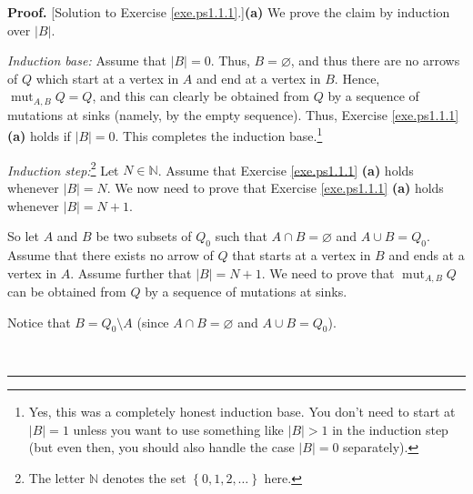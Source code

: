 \documentclass[numbers=enddot,12pt,final,onecolumn,notitlepage]{scrartcl}%
\numberwithin{exer}{section}
\theoremstyle{definition}
\newenvironment{proof}[1][Proof]{\noindent\textbf{#1.} }{\ \rule{0.5em}{0.5em}}
\begin{document}
\begin{proof}
[Solution to Exercise \ref{exe.ps1.1.1}.]\textbf{(a)} We prove the claim by
induction over $\left\vert B\right\vert $.

\textit{Induction base:} Assume that $\left\vert B\right\vert =0$. Thus,
$B=\varnothing$, and thus there are no arrows of $Q$ which start at a vertex
in $A$ and end at a vertex in $B$. Hence, $\operatorname*{mut}\nolimits_{A,B}%
Q=Q$, and this can clearly be obtained from $Q$ by a sequence of mutations at
sinks (namely, by the empty sequence). Thus, Exercise \ref{exe.ps1.1.1}
\textbf{(a)} holds if $\left\vert B\right\vert =0$. This completes the
induction base.\footnote{Yes, this was a completely honest induction base. You
don't need to start at $\left\vert B\right\vert =1$ unless you want to use
something like $\left\vert B\right\vert >1$ in the induction step (but even
then, you should also handle the case $\left\vert B\right\vert =0$
separately).}

\textit{Induction step:}\footnote{The letter $\mathbb{N}$ denotes the set
$\left\{  0,1,2,\ldots\right\}  $ here.} Let $N\in\mathbb{N}$. Assume that
Exercise \ref{exe.ps1.1.1} \textbf{(a)} holds whenever $\left\vert
B\right\vert =N$. We now need to prove that Exercise \ref{exe.ps1.1.1}
\textbf{(a)} holds whenever $\left\vert B\right\vert =N+1$.

So let $A$ and $B$ be two subsets of $Q_{0}$ such that $A\cap B=\varnothing$
and $A\cup B=Q_{0}$. Assume that there exists no arrow of $Q$ that starts at a
vertex in $B$ and ends at a vertex in $A$. Assume further that $\left\vert
B\right\vert =N+1$. We need to prove that $\operatorname*{mut}\nolimits_{A,B}%
Q$ can be obtained from $Q$ by a sequence of mutations at sinks.

Notice that $B=Q_{0}\setminus A$ (since $A\cap B=\varnothing$ and $A\cup
B=Q_{0}$).


\end{proof}
\end{document}
